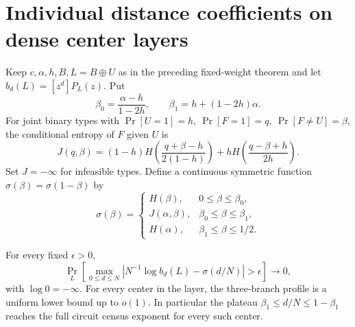 \section{Individual distance coefficients on dense center layers}
Keep \(c,\alpha,h,B,L=B\oplus U\) as in the preceding fixed-weight theorem and let \(b_d(L)=[z^d]P_L(z)\). Put
\[
 \beta_0=\frac{\alpha-h}{1-2h},\qquad
 \beta_1=h+(1-2h)\alpha .
\]
For joint binary types with \(\Pr[U=1]=h,\ \Pr[F=1]=q,\ \Pr[F\ne U]=\beta\), the conditional entropy of \(F\) given \(U\) is
\[
 J(q,\beta)=(1-h)H\left(\frac{q+\beta-h}{2(1-h)}\right)
  +hH\left(\frac{q-\beta+h}{2h}\right).
\]
Set \(J=-\infty\) for infeasible types. Define a continuous symmetric function \(\sigma(\beta)=\sigma(1-\beta)\) by
\[
 \sigma(\beta)=
 \begin{cases}
 H(\beta),&0\le\beta\le\beta_0,\\
 J(\alpha,\beta),&\beta_0\le\beta\le\beta_1,\\
 H(\alpha),&\beta_1\le\beta\le1/2 .
 \end{cases}
\]
\begin{theorem}
For every fixed \(\epsilon>0\),
\[
 \Pr_L\!\left[\max_{0\le d\le N}
   \left|N^{-1}\log b_d(L)-\sigma(d/N)\right|>\epsilon\right]\longrightarrow0 ,
\]
with \(\log0=-\infty\). For every center in the layer, the three-branch profile is a uniform lower bound up to \(o(1)\). In particular the plateau \(\beta_1\le d/N\le1-\beta_1\) reaches the full circuit census exponent for every such center.
\end{theorem}
